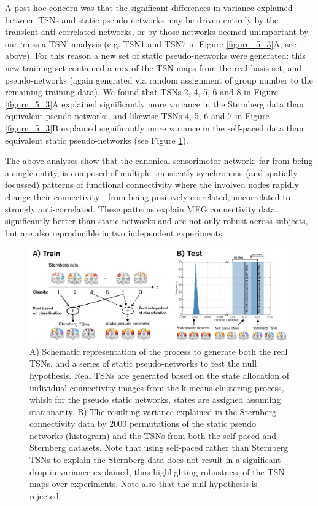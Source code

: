 A post-hoc concern was that the significant differences in variance explained between TSNs and static pseudo-networks may be driven entirely by the transient anti-correlated networks, or by those networks deemed unimportant by our ‘miss-a-TSN’ analysis (e.g. TSN1 and TSN7 in Figure \ref{figure_5_3}A; see above). For this reason a new set of static pseudo-networks were generated: this new training set contained a mix of the TSN maps from the real basis set, and pseudo-networks (again generated via random assignment of group number to the remaining training data). We found that TSNs 2, 4, 5, 6 and 8 in Figure \ref{figure_5_3}A explained significantly more variance in the Sternberg data than equivalent pseudo-networks, and likewise TSNs 4, 5, 6 and 7 in Figure \ref{figure_5_3}B explained significantly more variance in the self-paced data than equivalent static pseudo-networks (see Figure \ref{figure_5_4}). 

The above analyses show that the canonical sensorimotor network, far from being a single entity, is composed of multiple transiently synchronous (and spatially focussed) patterns of functional connectivity where the involved nodes rapidly change their connectivity - from being positively correlated, uncorrelated to strongly anti-correlated. These patterns explain MEG connectivity data significantly better than static networks and are not only robust across subjects, but are also reproducible in two independent experiments.


	\begin{figure}[h]
		\begin{center}
			\includegraphics[width=\linewidth]{./images/chapter5/Figure_4.png}
			\caption{A) Schematic representation of the process to generate both the real TSNs, and a series of static pseudo-networks to test the null hypothesis. Real TSNs are generated based on the state allocation of individual connectivity images from the k-means clustering process, whislt for the pseudo static networks, states are assigned assuming stationarity. B) The resulting variance explained in the Sternberg connectivity data by 2000 permutations of the static pseudo networks (histogram) and the TSNs from both the self-paced and Sternberg datasets. Note that using self-paced rather than Sternberg TSNs to explain the Sternberg data does not result in a significant drop in variance explained, thus highlighting robustness of the TSN maps over experiments. Note also that the null hypothesis is rejected. \label{figure_5_4}}
		\end{center}
	\end{figure}


